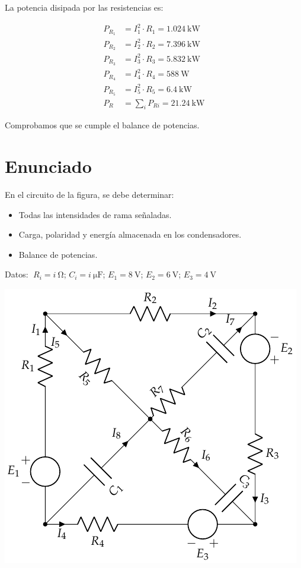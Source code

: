 \vspace{3mm}
La potencia disipada por las resistencias es:

\vspace{-3mm}
\begin{align*}
  P_{R_1} &= I_1^2 \cdot R_1 = \qty{1,024}{\kilo\watt}\\
  P_{R_2} &= I_2^2 \cdot R_2 = \qty{7,396}{\kilo\watt}\\
  P_{R_3} &= I_3^2 \cdot R_3 = \qty{5,832}{\kilo\watt}\\
  P_{R_4} &= I_4^2 \cdot R_4 = \qty{588}{\watt}\\
  P_{R_5} &= I_5^2 \cdot R_5 = \qty{6,4}{\kilo\watt}\\
  P_R &= \sum_i P_{Ri} = \qty{21,24}{\kilo\watt}  
\end{align*}

Comprobamos que se cumple el balance de potencias.

\section{Enunciado}
En el circuito de la figura, se debe determinar:
\begin{itemize}
\item Todas las intensidades de rama señaladas.
\item Carga, polaridad y energía almacenada en los condensadores.
\item Balance de potencias.
\end{itemize}

  Datos: $ \; R_i = \qty[parse-numbers=false]{i}{\ohm}$; \; $C_i = \qty[parse-numbers=false]{i}{\micro\farad}$; \; $E_1 = \qty{8}{\volt}$; \; $E_2 = \qty{6}{\volt}$; \; $E_3 = \qty{4}{\volt}$

\begin{center}
  \includegraphics{figuras/BT1_09.pdf}
\end{center}


